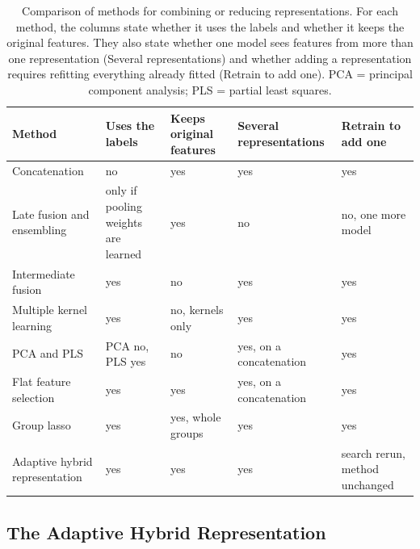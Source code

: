 \begin{table}[htbp]
\centering
\small
\setlength{\tabcolsep}{3pt}
\begin{adjustbox}{max width=\textwidth}
\begin{tabular}{P{4.2cm}P{2.3cm}P{2.1cm}P{2.3cm}P{2.6cm}}
\toprule
Method & Uses the labels & Keeps original features & Several representations & Retrain to add one \\
\midrule
Concatenation \citep{Stahlschmidt2022} & no & yes & yes & yes \\
Late fusion and ensembling \citep{Steyaert2023, Valsecchi2020} & only if pooling weights are learned & yes & no & no, one more model \\
Intermediate fusion \citep{Wang2021} & yes & no & yes & yes \\
Multiple kernel learning \citep{Gonen2011, Cichonska2018} & yes & no, kernels only & yes & yes \\
PCA and PLS \citep{Jolliffe2016, Wold2001} & PCA no, PLS yes & no & yes, on a concatenation & yes \\
Flat feature selection \citep{Guyon2003} & yes & yes & yes, on a concatenation & yes \\
Group lasso \citep{Yuan2006} & yes & yes, whole groups & yes & yes \\
Adaptive hybrid representation & yes & yes & yes & search rerun, method unchanged \\
\bottomrule
\end{tabular}
\end{adjustbox}
\caption[Methods for combining or reducing representations.]{Comparison of methods for combining or reducing representations. For each method, the columns state whether it uses the labels and whether it keeps the original features. They also state whether one model sees features from more than one representation (Several representations) and whether adding a representation requires refitting everything already fitted (Retrain to add one). PCA = principal component analysis; PLS = partial least squares.}
\label{tab:hybrid_alternatives}
\end{table}
\subsection{The Adaptive Hybrid Representation}

